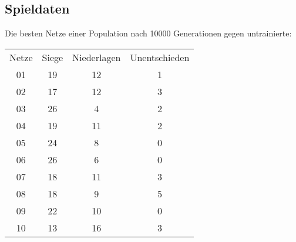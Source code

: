 \begin{appendices}
\section{Spieldaten}

Die besten Netze einer Population nach 10000 Generationen
gegen untrainierte:\\

\begin{tabular}[t]{cccc}
    \label{tab:gamedata}
    Netze & Siege & Niederlagen & Unentschieden\\
    01    & 19    & 12          & 1\\
    02    & 17    & 12          & 3\\
    03    & 26    & 4           & 2\\
    04    & 19    & 11          & 2\\
    05    & 24    & 8           & 0\\
    06    & 26    & 6           & 0\\
    07    & 18    & 11          & 3\\
    08    & 18    & 9           & 5\\
    09    & 22    & 10          & 0\\
    10    & 13    & 16          & 3
  \end{tabular}

\end{appendices}
